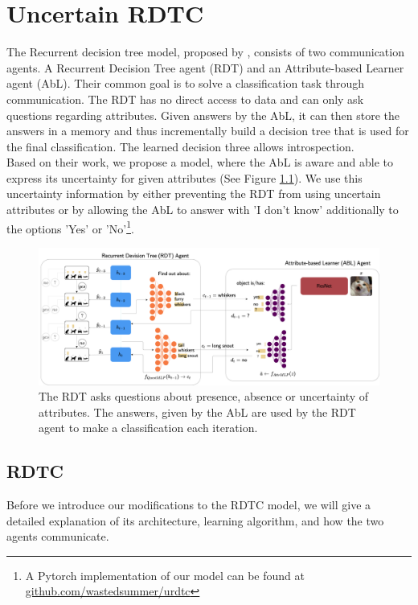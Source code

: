\documentclass[a4paper,cleardoubleempty,BCOR1cm, 11pt]{report}
\begin{document}
\chapter{Uncertain RDTC} %
The Recurrent decision tree model, proposed by \citet{alaniz2019explainable}, consists of two communication agents. A Recurrent Decision Tree agent (RDT) and an Attribute-based Learner agent (AbL). Their common goal is to solve a classification task through communication. The RDT has no direct access to data and can only ask questions regarding attributes. Given answers by the AbL, it can then store the answers in a memory and thus incrementally build a decision tree that is used for the final classification. The learned decision three allows introspection.\\
Based on their work, we propose a model, where the AbL is aware and able to express its uncertainty for given attributes (See Figure \ref{fig:uncertainRDTC}). We use this uncertainty information by either preventing the RDT from using uncertain attributes or by allowing the AbL to answer with 'I don't know' additionally to the options 'Yes' or 'No'\footnote{A Pytorch implementation of our model can be found at \url{github.com/wastedsummer/urdtc}}. 



\begin{figure}
	\centering
	\includegraphics[width=1\textwidth]{images/uncertaintRDTC.pdf} 
	\caption{The RDT asks questions about presence, absence or uncertainty of attributes. The answers, given by the AbL are used by the RDT agent to make a classification each iteration.}
	\label{fig:uncertainRDTC}
\end{figure}

\section{RDTC} 
Before we introduce our modifications to the RDTC model, we will give a detailed explanation of its architecture, learning algorithm, and how the two agents communicate.
\end{document}
